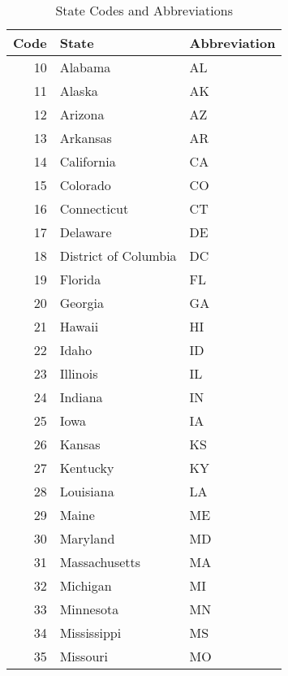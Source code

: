 \documentclass[11pt]{article}
\begin{document}
\begin{table}[H]
\begin{center}
\begin{tabular}{rll}
\toprule
\textbf{Code} & \textbf{State} & \textbf{Abbreviation} \\
\midrule
10 & Alabama & AL \\
11 & Alaska & AK \\
12 & Arizona & AZ \\
13 & Arkansas & AR \\
14 & California & CA \\
15 & Colorado & CO \\
16 & Connecticut & CT \\
17 & Delaware & DE \\
18 & District of Columbia & DC \\
19 & Florida & FL \\
20 & Georgia & GA \\
21 & Hawaii & HI \\
22 & Idaho & ID \\
23 & Illinois & IL \\
24 & Indiana & IN \\
25 & Iowa & IA \\
26 & Kansas & KS \\
27 & Kentucky & KY \\
28 & Louisiana & LA \\
29 & Maine & ME \\
30 & Maryland & MD \\
31 & Massachusetts & MA \\
32 & Michigan & MI \\
33 & Minnesota & MN \\
34 & Mississippi & MS \\
35 & Missouri & MO \\
\bottomrule
\end{tabular}
\caption{\label{t.state.codes.1}State Codes and Abbreviations}
\end{center}
\end{table}
\end{document}
